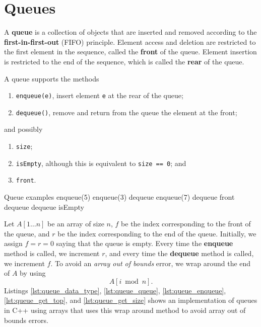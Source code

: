 
\section{Queues}

\begin{definition}
    A \textbf{queue} is a collection of objects that are inserted and removed according to the \textbf{first-in-first-out} (FIFO) principle. Element access and deletion are restricted to the first element in the sequence, called the \textbf{front} of the queue. Element insertion is restricted to the end of the sequence, which is called the \textbf{rear} of the queue.
    
    A queue supports the methods
    
    \begin{enumerate}
        \item \texttt{enqueue(e)}, insert element \texttt{e} at the rear of the queue;
        \item \texttt{dequeue()}, remove and return from the queue the element at the front;
    \end{enumerate}
    and possibly
    
    \begin{enumerate}[resume]
        \item \texttt{size};
        \item \texttt{isEmpty}, although this is equivalent to \texttt{size == 0}; and
        \item \texttt{front}.
    \end{enumerate}
\end{definition}

\begin{example}
    Queue examples
enqueue(5)
enqueue(3)
dequeue
enqueue(7)
dequeue
front
dequeue
dequeue
isEmpty
\end{example}

Let $A[1\ldots n]$ be an array of size $n$, $f$ be the index corresponding to the front of the queue, and $r$ be the index corresponding to the end of the queue. Initially, we assign $f=r=0$ saying that the queue is empty. Every time the \textbf{enqueue} method is called, we increment $r$, and every time the \textbf{dequeue} method is called, we increment $f$. To avoid an \emph{array out of bounds} error, we wrap around the end of $A$ by using
\[A[i\bmod n].\] Listings \ref{lst:queue_data_type}, \ref{lst:queue_queue}, \ref{lst:queue_enqueue}, \ref{lst:queue_get_top}, and \ref{lst:queue_get_size} shows an implementation of queues in C++ using arrays that uses this wrap around method to avoid array out of bounds errors.

